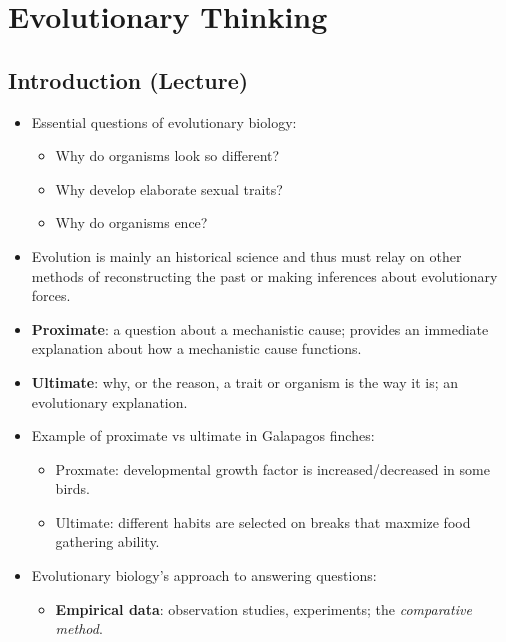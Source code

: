\documentclass[12pt,a4paper]{article}
\begin{document}
\tableofcontents
\cleardoublepage
\fancyhead{}

\clearpage
\section{Evolutionary Thinking}
\subsection{Introduction (Lecture)}
\begin{itemize}
    \item Essential questions of evolutionary biology: 
        \begin{itemize}
            \item Why do organisms look so different?
            \item Why develop elaborate sexual traits?
            \item Why do organisms ence?
        \end{itemize}
    \item Evolution is mainly an historical science and thus must relay on other methods of reconstructing the past or making inferences about evolutionary forces. 
    \item \textbf{Proximate}: a question about a mechanistic cause; provides an immediate explanation about {\color{o-Sun}how} a mechanistic cause functions.
    \item \textbf{Ultimate}: {\color{o-Sun}why}, or the reason, a trait or organism is the way it is; an evolutionary explanation.
    \item Example of proximate vs ultimate in Galapagos finches: 
        \begin{itemize}
            \item Proxmate: developmental growth factor is increased/decreased in some birds.
            \item Ultimate: different habits are selected on breaks that maxmize food gathering ability.
        \end{itemize}
    \item Evolutionary biology's approach to answering questions:
        \begin{itemize}
            \item \textbf{Empirical data}: {\color{o-Sun}observation} studies, experiments; the \textit{comparative method}.

\end{itemize}
\end{itemize}
\end{document}
